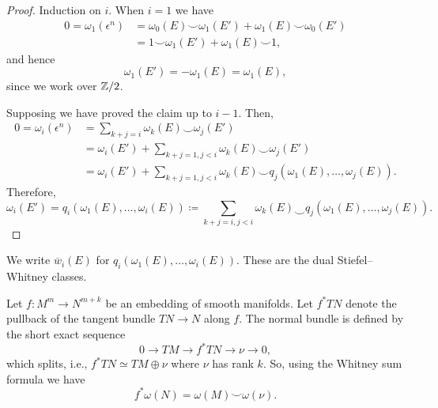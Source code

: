 \documentclass[ma3408.tex]{subfiles}
\begin{document}
\begin{proof}
Induction on $i$. When $i = 1$ we have
\[
\begin{split}
0 = \omega_1(\epsilon^n) &= \omega_0(E) \smile \omega_1(E')+ \omega_1(E) \smile \omega_0(E')\\
&=  1 \smile \omega_1(E') + \omega_1(E) \smile 1,
\end{split}
\]
and hence 
\[
\omega_1(E') = -\omega_1(E) = \omega_1(E),
\]
since we work over $\mathbb{Z}/2$. 

Supposing we have proved the claim up to $i-1$. Then,
\[
\begin{split}
0 = \omega_i(\epsilon^n) &= \sum_{k+j=i} \omega_k(E) \smile \omega_j(E') \\
&= \omega_i(E') + \sum_{k+j=1, j < i} \omega_k(E) \smile \omega_j(E') \\
& = \omega_i(E') + \sum_{k+j=1, j < i} \omega_k(E) \smile q_j(\omega_1(E),\ldots,\omega_j(E)).
\end{split}
\]
Therefore,
\[
\omega_i(E') = q_i(\omega_1(E),\ldots,\omega_i(E)) \coloneqq \sum_{k+j=i,j<i} \omega_k(E) \smile q_j(\omega_1(E),\ldots,\omega_j(E)).
\]
\end{proof}
\begin{Def}
We write $\overline{w}_i(E)$ for $q_i(\omega_1(E),\ldots,\omega_i(E))$. These are the dual Stiefel--Whitney classes.
\end{Def}
\begin{Rem}
Let $f \colon M^{m} \to N^{m+k}$ be an embedding of smooth manifolds. Let $f^*TN$ denote the pullback of the tangent bundle $TN \to N$ along $f$. The normal bundle is defined by the short exact sequence 
\[
0 \to TM \to f^*TN \to \nu \to 0,
\]
which splits, i.e., $f^*TN \simeq TM \oplus \nu$ where $\nu$ has rank $k$. So, using the Whitney sum formula we have
\[
f^*\omega(N)= \omega(M) \smile \omega(\nu). 
\]
\end{Rem}
\end{document}

